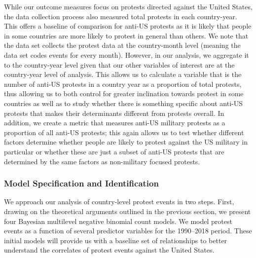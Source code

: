 		While our outcome measures focus on protests directed against the United States, the data collection process also measured total protests in each country-year. This offers a baseline of comparison for anti-US protests as it is likely that people in some countries are more likely to protest in general than others. We note that the data set collects the protest data at the country-month level (meaning the data set codes events for every month). However, in our analysis, we aggregate it to the country-year level given that our other variables of interest are at the country-year level of analysis.  This allows us to calculate a variable that is the number of anti-US protests in a country year as a proportion of total protests, thus allowing us to both control for greater inclination towards protest in some countries as well as to study whether there is something specific about anti-US protests that makes their determinants different from protests overall. In addition, we create a metric that measures anti-US military protests as a proportion of all anti-US protests; this again allows us to test whether different factors determine whether people are likely to protest against the US military in particular or whether these are just a subset of anti-US protests that are determined by the same factors as non-military focused protests.           
		
		
		\subsubsection*{Model Specification and Identification}
		
		
		We approach our analysis of country-level protest events in two steps. First, drawing on the theoretical arguments outlined in the previous section, we present four Bayesian multilevel negative binomial count models. We model protest events as a function of several predictor variables for the 1990--2018 period. These initial models will provide us with a baseline set of relationships to better understand the correlates of protest events against the United States. 
		
